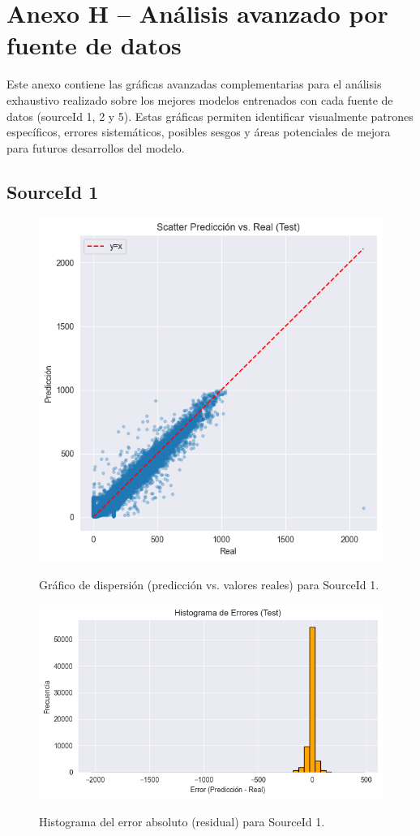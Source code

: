 \section*{Anexo H – Análisis avanzado por fuente de datos}
\label{anexo:analisis_avanzado}

Este anexo contiene las gráficas avanzadas complementarias para el análisis exhaustivo realizado sobre los mejores modelos entrenados con cada fuente de datos (sourceId 1, 2 y 5). Estas gráficas permiten identificar visualmente patrones específicos, errores sistemáticos, posibles sesgos y áreas potenciales de mejora para futuros desarrollos del modelo.

\subsection*{SourceId 1}

\begin{figure}[H]
	\centering
	\caption{Gráfico de dispersión (predicción vs. valores reales) para SourceId 1.}
	\includegraphics[width=0.75\linewidth]{includes/cap5/graphs/advanced/sid1_scatter_predicted_vs_actual.png}
	\label{fig:sid1_scatter}
\end{figure}

\begin{figure}[H]
	\centering
	\caption{Histograma del error absoluto (residual) para SourceId 1.}
	\includegraphics[width=0.75\linewidth]{includes/cap5/graphs/advanced/sid1_error_histogram_predicted_vs_actual.png}
	\label{fig:sid1_histograma_error}
\end{figure}

